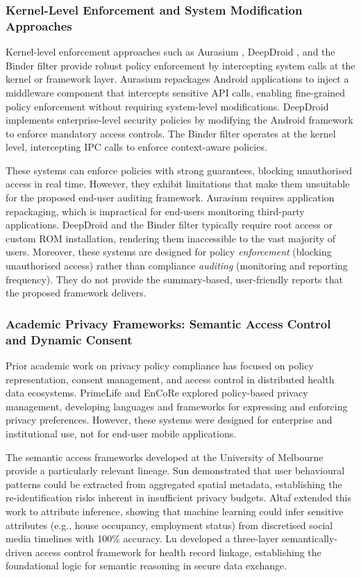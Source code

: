 \subsubsection{Kernel-Level Enforcement and System Modification Approaches}
Kernel-level enforcement approaches such as Aurasium \cite{42}, DeepDroid \cite{44}, and the Binder filter \cite{45} provide robust policy enforcement by intercepting system calls at the kernel or framework layer. Aurasium \cite{42} repackages Android applications to inject a middleware component that intercepts sensitive API calls, enabling fine-grained policy enforcement without requiring system-level modifications. DeepDroid \cite{44} implements enterprise-level security policies by modifying the Android framework to enforce mandatory access controls. The Binder filter \cite{45} operates at the kernel level, intercepting IPC calls to enforce context-aware policies.

These systems can enforce policies with strong guarantees, blocking unauthorised access in real time. However, they exhibit limitations that make them unsuitable for the proposed end-user auditing framework. Aurasium requires application repackaging, which is impractical for end-users monitoring third-party applications. DeepDroid and the Binder filter typically require root access or custom ROM installation, rendering them inaccessible to the vast majority of users. Moreover, these systems are designed for policy \emph{enforcement} (blocking unauthorised access) rather than compliance \emph{auditing} (monitoring and reporting frequency). They do not provide the summary-based, user-friendly reports that the proposed framework delivers.

\subsubsection{Academic Privacy Frameworks: Semantic Access Control and Dynamic Consent}
Prior academic work on privacy policy compliance has focused on policy representation, consent management, and access control in distributed health data ecosystems. PrimeLife and EnCoRe explored policy-based privacy management, developing languages and frameworks for expressing and enforcing privacy preferences. However, these systems were designed for enterprise and institutional use, not for end-user mobile applications.

The semantic access frameworks developed at the University of Melbourne provide a particularly relevant lineage. Sun \cite{15} demonstrated that user behavioural patterns could be extracted from aggregated spatial metadata, establishing the re-identification risks inherent in insufficient privacy budgets. Altaf \cite{16} extended this work to attribute inference, showing that machine learning could infer sensitive attributes (e.g., house occupancy, employment status) from discretised social media timelines with 100\% accuracy. Lu \cite{17} developed a three-layer semantically-driven access control framework for health record linkage, establishing the foundational logic for semantic reasoning in secure data exchange.


